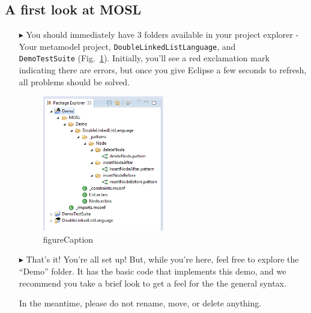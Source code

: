 \newpage
\texHeader
\hypertarget{simpleDemo tex}{} 
\subsection{A first look at MOSL}

\begin{itemize}

\item[$\blacktriangleright$] You should immediately have 3 folders available in your project explorer - Your metamodel project,
\texttt{DoubleLinkedListLanguage}, and \\ \texttt{DemoTestSuite} (Fig.~\ref{fig:texErrors}). Initially, you'll see a red exclamation mark indicating there
are errors, but once you give Eclipse a few seconds to refresh, all problems should be solved.

\begin{figure}[htp]
\begin{center}
  \includegraphics[width=0.5\textwidth]{eclipse_loadedTexDemo}
  \caption{figureCaption}
  \label{fig:texErrors}
\end{center}
\end{figure}

\item[$\blacktriangleright$] That's it! You're all set up! But, while you're here, feel free to explore the ``Demo'' folder. It has the basic code that implements
this demo, and we recommend you take a brief look to get a feel for the the general syntax.

In the meantime, please do not rename, move, or delete anything.


\end{itemize}